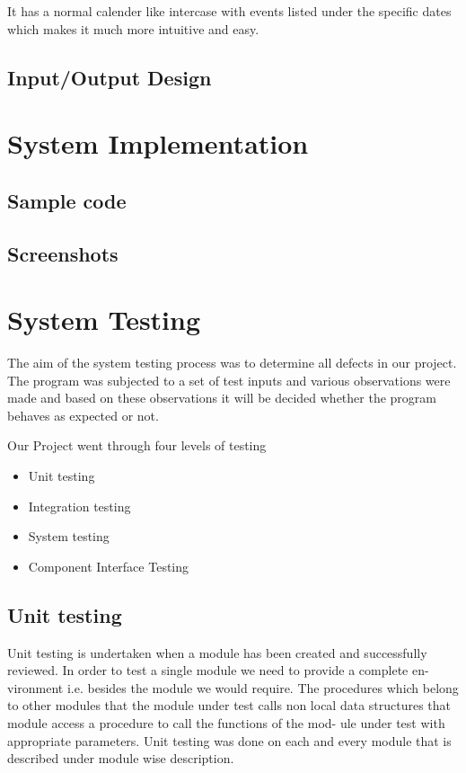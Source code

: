 \documentclass{article}
\begin{document}
It has a normal calender like intercase with events listed under the specific dates which makes it much more intuitive and easy.

\vspace{1em}
\subsection{Input/Output Design}
\vspace{1em}


\newpage

\section{System Implementation}
\vspace{1em}

\subsection{Sample code}
\vspace{1em}
\subsection{Screenshots}
\vspace{1em}


\newpage


\section{System Testing}
\vspace{1em}

The aim of the system testing process was to determine all defects in our project. The program was subjected to a set of test inputs and various observations were made and based on these observations it will be decided whether the program behaves as expected or not.

Our Project went through four levels of testing
\begin{itemize}
\item Unit testing
\item Integration testing
\item System testing
\item Component Interface Testing
\end{itemize}

\subsection{Unit testing}
Unit testing is undertaken when a module has been created and successfully reviewed. In order to test a single module we need to provide a complete en- vironment i.e. besides the module we would require. The procedures which belong to other modules that the module under test calls non local data structures that module access a procedure to call the functions of the mod- ule under test with appropriate parameters. Unit testing was done on each and every module that is described under module wise description.
\end{document}
